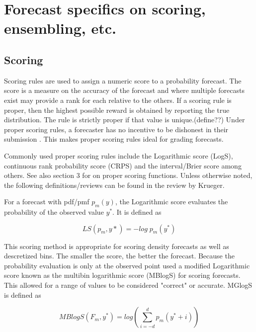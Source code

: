 \documentclass{article}\usepackage[]{graphicx}\usepackage[]{color}
\begin{document}
	 
\section{Forecast specifics on scoring, ensembling, etc.}

\subsection{Scoring}

Scoring rules are used to assign a numeric score to a probability forecast. The
score is a measure on the accuracy of the forecast and where multiple forecasts
exist may provide a rank for each relative to the others. If a scoring rule is 
proper, then the highest possible reward is obtained by reporting the true 
distribution. The rule is strictly proper if that value is unique.(define??) 
Under proper
scoring rules, a forecaster has no incentive to be dishonest in their 
submission \cite{gneiting2007strictly}. This makes proper scoring rules ideal
for grading forecasts.

Commonly used proper scoring rules include the Logarithmic score (LogS), 
continuous rank probability score (CRPS) \cite{hersbach2000decomposition}
\cite{alves2013ncep} and the interval/Brier 
score \cite{gneiting2007strictly} among 
others. See also \cite{gneiting2014probabilistic}
section 3 for on proper scoring functions. Unless otherwise noted, the following
definitions/reviews can be found in the review by Krueger.

For a forecast with pdf/pmf $p_m(y)$, the Logarithmic score evaluates the 
probability of the observed value $y^*$. It is defined as

\begin{equation}
  LS(p_m,y*) = -log\;p_m(y^*)
\end{equation}

This scoring method is appropriate for scoring density forecasts as well as 
descretized bins. The smaller the score, the better the forecast.
Because the probability evaluation is only at the observed 
point \cite{reich2019accuracy} used a modified Logarithmic score 
known as the multibin logarithmic score (MBlogS) for scoring
forecasts. This allowed for a range of values to be considered "correct" or 
accurate. MGlogS is defined as

\begin{equation}
  MBlogS(F_m, y^*) = log(\sum_{i=-d}^{d} p_m(y^* + i))
\end{equation}
\end{document}
